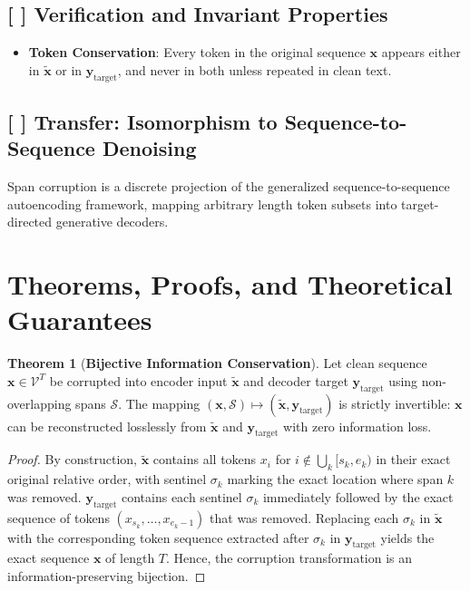 \documentclass[11pt,a4paper]{article}
\theoremstyle{definition}
\newtheorem{theorem}{\textbf{Theorem}}[section]
\begin{document}
\subsection{[ ] Verification and Invariant Properties}
\begin{itemize}
    \item \textbf{Token Conservation}: Every token in the original sequence $\mathbf{x}$ appears either in $\tilde{\mathbf{x}}$ or in $\mathbf{y}_{\text{target}}$, and never in both unless repeated in clean text.
\end{itemize}

\subsection{[ ] Transfer: Isomorphism to Sequence-to-Sequence Denoising}
Span corruption is a discrete projection of the generalized sequence-to-sequence autoencoding framework, mapping arbitrary length token subsets into target-directed generative decoders.

\section{Theorems, Proofs, and Theoretical Guarantees}

\begin{theorem}[\textbf{Bijective Information Conservation}]
Let clean sequence $\mathbf{x} \in \mathcal{V}^T$ be corrupted into encoder input $\tilde{\mathbf{x}}$ and decoder target $\mathbf{y}_{\text{target}}$ using non-overlapping spans $\mathcal{S}$. The mapping $(\mathbf{x}, \mathcal{S}) \mapsto (\tilde{\mathbf{x}}, \mathbf{y}_{\text{target}})$ is strictly invertible: $\mathbf{x}$ can be reconstructed losslessly from $\tilde{\mathbf{x}}$ and $\mathbf{y}_{\text{target}}$ with zero information loss.
\end{theorem}

\begin{proof}
By construction, $\tilde{\mathbf{x}}$ contains all tokens $x_i$ for $i \notin \bigcup_k [s_k, e_k)$ in their exact original relative order, with sentinel $\sigma_k$ marking the exact location where span $k$ was removed.
$\mathbf{y}_{\text{target}}$ contains each sentinel $\sigma_k$ immediately followed by the exact sequence of tokens $(x_{s_k}, \dots, x_{e_k - 1})$ that was removed.
Replacing each $\sigma_k$ in $\tilde{\mathbf{x}}$ with the corresponding token sequence extracted after $\sigma_k$ in $\mathbf{y}_{\text{target}}$ yields the exact sequence $\mathbf{x}$ of length $T$. Hence, the corruption transformation is an information-preserving bijection.
\end{proof}
\end{document}

